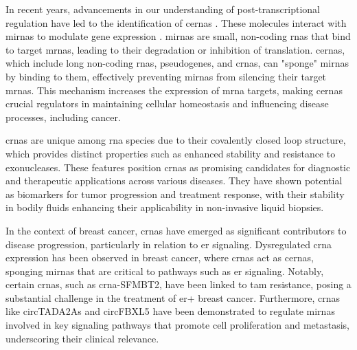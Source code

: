 In recent years, advancements in our understanding of post-transcriptional
regulation have led to the identification of \glspl{cerna}
\supercite{salmena_cerna_2011,tay_multilayered_2014}.
These molecules interact with \glspl{mirna} to modulate gene expression
\supercite{salmena_cerna_2011,li_long_2017}.
\glspl{mirna} are small, non-coding \glspl{rna} that bind to target
\glspl{mrna},
leading to their degradation or inhibition of
translation\supercite{salmena_cerna_2011,tay_multilayered_2014}.
\Glspl{cerna}, which include long non-coding \glspl{rna}, pseudogenes, and
\glspl{crna}, can
"sponge" \glspl{mirna} by binding to them, effectively preventing \glspl{mirna}
from silencing their target
\glspl{mrna}\supercite{salmena_cerna_2011,poliseno_coding-independent_2010}.
This mechanism increases the expression of \gls{mrna} targets, making
\glspl{cerna} crucial regulators in maintaining cellular homeostasis and
influencing disease processes, including
cancer\supercite{salmena_cerna_2011,vo_landscape_2019}.

\Glspl{crna} are unique among \gls{rna} species due to their covalently closed
loop
structure, which provides distinct properties such as enhanced stability and
resistance to exonucleases\supercite{vo_landscape_2019}.
These features position \glspl{crna} as promising candidates for diagnostic and
therapeutic applications across various
diseases\supercite{ma_circular_2020,hoque_exploring_2023,wilusz_circular_2017}.
They have shown potential as biomarkers for tumor progression and treatment
response\supercite{bao_prognostic_2020,ren_construction_2017}, with their
stability in bodily fluids enhancing their applicability in non-invasive liquid
biopsies\supercite{bao_prognostic_2020,zhang_circular_2018}.

In the context of breast cancer, \glspl{crna} have emerged as significant
contributors to disease progression, particularly in relation to \gls{er} signaling.
Dysregulated \gls{crna} expression has been observed in breast cancer, where
\glspl{crna} act as \glspl{cerna}, sponging \glspl{mirna} that are critical to
pathways such as \gls{er} signaling\supercite{nair_circular_2016,xu_circrna_2022}.
Notably, certain \glspl{crna}, such as \gls{crna}-SFMBT2, have been linked to
\gls{tam} resistance, posing a substantial challenge in the treatment of
\gls{er+} breast cancer\supercite{li_circrna-sfmbt2_2023}.
Furthermore, \glspl{crna} like circTADA2As and circFBXL5 have been demonstrated
to regulate \glspl{mirna} involved in key signaling pathways that promote cell
proliferation and metastasis, underscoring their clinical
relevance\supercite{xu_circtada2as_2019,gao_hsa_circrna_0006528_2019}.

